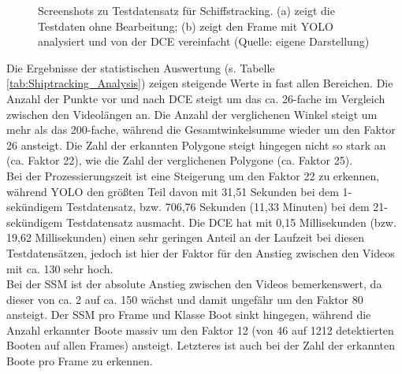 {\begin{figure}[ht]
		\caption[Screenshots zu Testdatensatz für Schiffstracking]{Screenshots zu Testdatensatz für Schiffstracking. (a) zeigt die Testdaten ohne Bearbeitung; (b) zeigt den Frame mit YOLO analysiert und von der DCE vereinfacht (Quelle: eigene Darstellung)}
		\label{Scr:Testdatensatz_Shiptracking}
	\end{figure} 
	Die Ergebnisse der statistischen Auswertung (s. Tabelle \ref{tab:Shiptracking_Analysis}) zeigen steigende Werte in fast allen Bereichen. Die Anzahl der Punkte vor und nach DCE steigt um das ca. 26-fache im Vergleich zwischen den Videolängen an. Die Anzahl der verglichenen Winkel steigt um mehr als das 200-fache, während die Gesamtwinkelsumme wieder um den Faktor 26  ansteigt. Die Zahl der erkannten Polygone steigt hingegen nicht so stark an (ca. Faktor 22), wie die Zahl der verglichenen Polygone (ca. Faktor 25). \\
	Bei der Prozessierungszeit ist eine Steigerung um den Faktor 22 zu erkennen, während YOLO den größten Teil davon mit 31,51 Sekunden bei dem 1-sekündigem Testdatensatz, bzw. 706,76 Sekunden (11,33 Minuten) bei dem 21-sekündigem Testdatensatz ausmacht. Die DCE hat mit 0,15 Millisekunden (bzw. 19,62 Millisekunden) einen sehr geringen Anteil an der Laufzeit bei diesen Testdatensätzen, jedoch ist hier der Faktor für den Anstieg zwischen den Videos mit ca. 130 sehr hoch. \\
	Bei der SSM ist der absolute Anstieg zwischen den Videos bemerkenswert, da dieser von ca. 2 auf ca. 150 wächst und damit ungefähr um den Faktor 80 ansteigt. Der SSM pro Frame und Klasse Boot sinkt hingegen, während die Anzahl erkannter Boote massiv um den Faktor 12 (von 46 auf 1212 detektierten Booten auf allen Frames) ansteigt. Letzteres ist auch bei der Zahl der erkannten Boote pro Frame zu erkennen. \\

}
